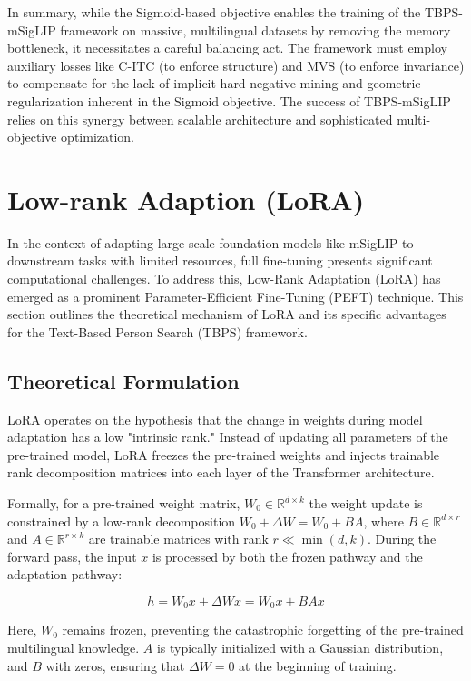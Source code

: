 \documentclass[../main.tex]{subfiles}
\begin{document}
In summary, while the Sigmoid-based objective enables the training of the TBPS-mSigLIP framework on massive, multilingual datasets by removing the memory bottleneck, it necessitates a careful balancing act. The framework must employ auxiliary losses like C-ITC (to enforce structure) and MVS (to enforce invariance) to compensate for the lack of implicit hard negative mining and geometric regularization inherent in the Sigmoid objective. The success of TBPS-mSigLIP relies on this synergy between scalable architecture and sophisticated multi-objective optimization.

\section{Low-rank Adaption (LoRA)}

In the context of adapting large-scale foundation models like mSigLIP to downstream tasks with limited resources, full fine-tuning presents significant computational challenges. To address this, Low-Rank Adaptation (LoRA) has emerged as a prominent Parameter-Efficient Fine-Tuning (PEFT) technique. This section outlines the theoretical mechanism of LoRA and its specific advantages for the Text-Based Person Search (TBPS) framework.

\subsection{Theoretical Formulation}

\noindent LoRA operates on the hypothesis that the change in weights during model adaptation has a low "intrinsic rank." Instead of updating all parameters of the pre-trained model, LoRA freezes the pre-trained weights and injects trainable rank decomposition matrices into each layer of the Transformer architecture.

\noindent Formally, for a pre-trained weight matrix, $W_0 \in \mathbb{R}^{d \times k}$ the weight update is constrained by a low-rank decomposition $W_0 + \Delta W = W_0 + BA$, where $B \in \mathbb{R}^{d \times r}$ and $A \in \mathbb{R}^{r \times k}$ are trainable matrices with rank $r \ll \min(d, k)$. During the forward pass, the input $x$ is processed by both the frozen pathway and the adaptation pathway:

\begin{equation}
    h = W_0 x + \Delta W x = W_0 x + BAx
\end{equation}

\noindent Here, $W_0$ remains frozen, preventing the catastrophic forgetting of the pre-trained multilingual knowledge. $A$ is typically initialized with a Gaussian distribution, and $B$ with zeros, ensuring that $\Delta W = 0$ at the beginning of training.
\end{document}
